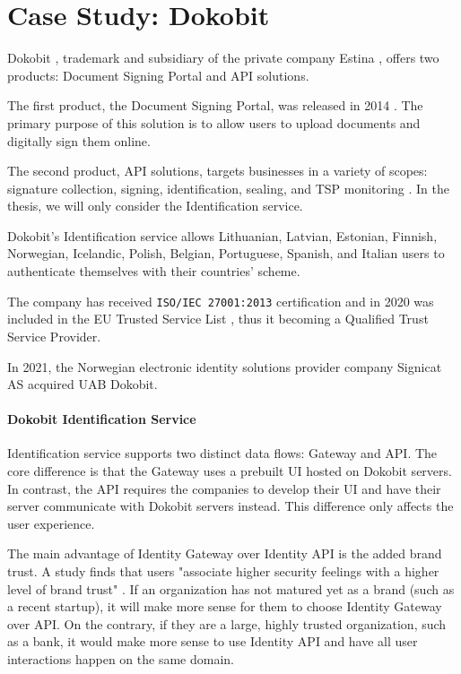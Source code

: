 \section{Case Study: Dokobit}

Dokobit \cite{dokobit}, trademark and subsidiary of the private company Estina \cite{euipo-dokobit}, offers two products: Document Signing Portal and API solutions.

The first product, the Document Signing Portal, was released in 2014 \cite{dokobit-aboutus}. The primary purpose of this solution is to allow users to upload documents and digitally sign them online.

The second product, API solutions, targets businesses in a variety of scopes: signature collection, signing, identification, sealing, and TSP monitoring \cite{dokobit}. In the thesis, we will only consider the Identification service.

Dokobit's Identification service allows Lithuanian, Latvian, Estonian, Finnish, Norwegian, Icelandic, Polish, Belgian, Portuguese, Spanish, and Italian \cite{dokobit} users to authenticate themselves with their countries' scheme.

The company has received \texttt{ISO/IEC 27001:2013} certification \cite{dokobit-certification} and in 2020 was included in the EU Trusted Service List \cite{eu-trustservices, dokobit-aboutus}, thus it becoming a Qualified Trust Service Provider.

In 2021, the Norwegian electronic identity solutions provider company Signicat AS acquired UAB Dokobit.

\paragraph{Dokobit Identification Service}

Identification service supports two distinct data flows: Gateway and API. The core difference is that the Gateway uses a prebuilt UI hosted on Dokobit servers. In contrast, the API requires the companies to develop their UI and have their server communicate with Dokobit servers instead. This difference only affects the user experience.

The main advantage of Identity Gateway over Identity API is the added brand trust. A study finds that users "associate higher security feelings with a higher level of brand trust" \cite{ha2004factors}. If an organization has not matured yet as a brand (such as a recent startup), it will make more sense for them to choose Identity Gateway over API. On the contrary, if they are a large, highly trusted organization, such as a bank, it would make more sense to use Identity API and have all user interactions happen on the same domain.

